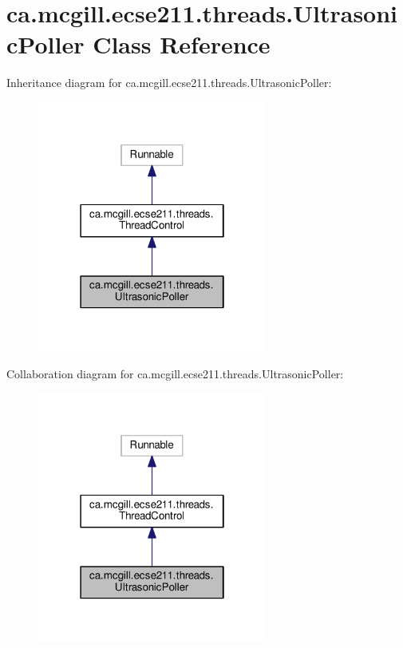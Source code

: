 \hypertarget{classca_1_1mcgill_1_1ecse211_1_1threads_1_1_ultrasonic_poller}{}\section{ca.\+mcgill.\+ecse211.\+threads.\+Ultrasonic\+Poller Class Reference}
\label{classca_1_1mcgill_1_1ecse211_1_1threads_1_1_ultrasonic_poller}


Inheritance diagram for ca.\+mcgill.\+ecse211.\+threads.\+Ultrasonic\+Poller\+:\nopagebreak
\begin{figure}[H]
\begin{center}
\leavevmode
\includegraphics[width=214pt]{classca_1_1mcgill_1_1ecse211_1_1threads_1_1_ultrasonic_poller__inherit__graph}
\end{center}
\end{figure}


Collaboration diagram for ca.\+mcgill.\+ecse211.\+threads.\+Ultrasonic\+Poller\+:\nopagebreak
\begin{figure}[H]
\begin{center}
\leavevmode
\includegraphics[width=214pt]{classca_1_1mcgill_1_1ecse211_1_1threads_1_1_ultrasonic_poller__coll__graph}
\end{center}
\end{figure}
